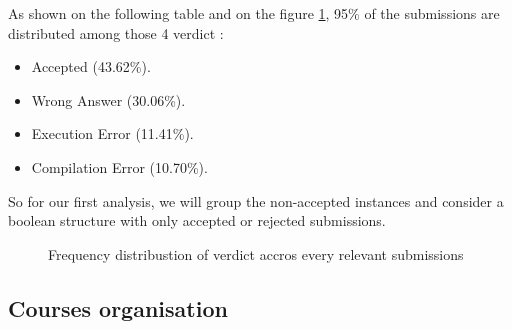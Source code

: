 As shown on the following table and on the figure \ref{fig:veredict_distrib}, 95\% of the submissions are distributed among those 4 verdict :
\begin{itemize}
  \setlength\itemsep{0em}
  \item Accepted (43.62\%).
  \item Wrong Answer (30.06\%).
  \item Execution Error (11.41\%).
  \item Compilation Error (10.70\%).
\end{itemize}

So for our first analysis, we will group the non-accepted instances and consider a boolean structure with only accepted or rejected submissions.

\begin{figure}[h!]
\centering
{}
\caption[Verdicts distribution]{Frequency distribustion of verdict accros every relevant submissions}
\label{fig:veredict_distrib}
\end{figure}






\subsection{Courses organisation} %
\label{sub:courses_organisation}

